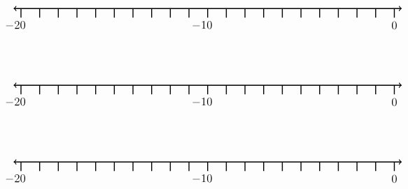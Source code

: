 \documentclass[leqno, 12pt]{article}
\begin{document}
\vspace{10pt}\begin{equation}
    \begin{tikzpicture}[scale=0.67, baseline={([yshift=-1pt]current bounding box.north)}]
        \draw[{To[scale=1.3]}-{To[scale=1.3]}, line width=1pt] (-20.4, 0) -- (0.4, 0);
        \foreach \x in {-20,-19,...,0}
            \draw[shift={(\x,0)},color=black, line width=1pt] (0pt,-14pt) -- (0pt,0pt);
        \foreach \x in {-20,-10}
            \draw[shift={(\x -0.3,-0.8)},color=black] node[font=\large,text height=12pt] {$\x$};
        \foreach \x in {0}
            \draw[shift={(\x,-0.8)},color=black] node[font=\large,text height=12pt] {$\x$};
        \node [font=\large, anchor=east] at (5,1.65) {$  $};
    \end{tikzpicture}
\end{equation}

\vspace{10pt}\begin{equation}
    \begin{tikzpicture}[scale=0.67, baseline={([yshift=-1pt]current bounding box.north)}]
        \draw[{To[scale=1.3]}-{To[scale=1.3]}, line width=1pt] (-20.4, 0) -- (0.4, 0);
        \foreach \x in {-20,-19,...,0}
            \draw[shift={(\x,0)},color=black, line width=1pt] (0pt,-14pt) -- (0pt,0pt);
        \foreach \x in {-20,-10}
            \draw[shift={(\x -0.3,-0.8)},color=black] node[font=\large,text height=12pt] {$\x$};
        \foreach \x in {0}
            \draw[shift={(\x,-0.8)},color=black] node[font=\large,text height=12pt] {$\x$};
        \node [font=\large, anchor=east] at (5,1.65) {$  $};
    \end{tikzpicture}
\end{equation}

\vspace{10pt}\begin{equation}
    \begin{tikzpicture}[scale=0.67, baseline={([yshift=-1pt]current bounding box.north)}]
        \draw[{To[scale=1.3]}-{To[scale=1.3]}, line width=1pt] (-20.4, 0) -- (0.4, 0);
        \foreach \x in {-20,-19,...,0}
            \draw[shift={(\x,0)},color=black, line width=1pt] (0pt,-14pt) -- (0pt,0pt);
        \foreach \x in {-20,-10}
            \draw[shift={(\x -0.3,-0.8)},color=black] node[font=\large,text height=12pt] {$\x$};
        \foreach \x in {0}
            \draw[shift={(\x,-0.8)},color=black] node[font=\large,text height=12pt] {$\x$};
        \node [font=\large, anchor=east] at (5,1.65) {$  $};
    \end{tikzpicture}
\end{equation}
\end{document}
